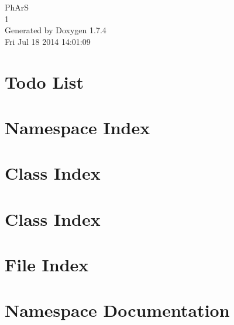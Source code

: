 \documentclass[a4paper]{book}
\begin{document}
\hypersetup{pageanchor=false}
\begin{titlepage}
\vspace*{7cm}
\begin{center}
{\Large PhArS \\[1ex]\large 1 }\\
\vspace*{1cm}
{\large Generated by Doxygen 1.7.4}\\
\vspace*{0.5cm}
{\small Fri Jul 18 2014 14:01:09}\\
\end{center}
\end{titlepage}
\clearemptydoublepage
{}
\tableofcontents
\clearemptydoublepage
{}
\hypersetup{pageanchor=true}
\chapter{Todo List}
\label{todo}
\hypertarget{todo}{}

\chapter{Namespace Index}

\chapter{Class Index}

\chapter{Class Index}

\chapter{File Index}

\chapter{Namespace Documentation}









\end{document}
